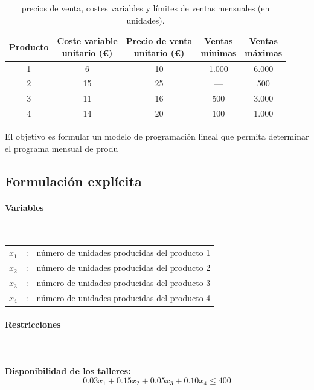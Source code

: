\begin{table}[!h]
\centering
\caption{precios de venta, costes variables y límites de ventas mensuales (en unidades).}
\label{tab:ventas_costes}
\begin{tabular}{c c c c c}
\hline
Producto & 
\makecell{Coste variable\\ unitario (€)} & 
\makecell{Precio de venta\\ unitario (€)} & 
\makecell{Ventas\\ mínimas} & 
\makecell{Ventas\\ máximas} \\ \hline
1 & 6  & 10 & 1.000 & 6.000 \\
2 & 15 & 25 & ---   & 500 \\
3 & 11 & 16 & 500   & 3.000 \\
4 & 14 & 20 & 100   & 1.000 \\ \hline
\end{tabular}
\end{table}

El objetivo es formular un modelo de programación lineal que permita determinar el programa mensual de produ

\subsection{Formulación explícita}

\paragraph{Variables}\mbox{}\\

\begin{tabular}{l c l}
    $x_1$  & : & número de unidades producidas del producto 1 \\
    $x_2$  & : & número de unidades producidas del producto 2 \\
    $x_3$  & : & número de unidades producidas del producto 3 \\
    $x_4$  & : & número de unidades producidas del producto 4 \\
\end{tabular}

\paragraph{Restricciones}\mbox{}\\
\\
\textbf{Disponibilidad de los talleres:}
\begin{equation}
0.03x_1 + 0.15x_2 + 0.05x_3 + 0.10x_4 \leq 400
\end{equation}

